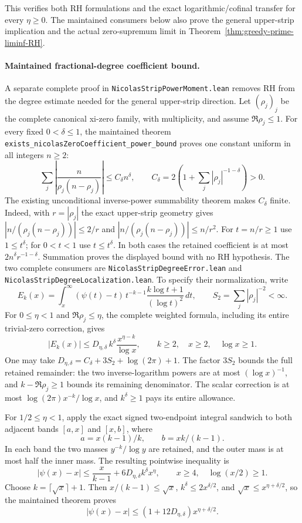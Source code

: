\documentclass[11pt]{article}
\theoremstyle{definition}
\begin{document}
This verifies both RH formulations and the exact logarithmic/cofinal
transfer for every $\eta\ge0$.
The maintained consumers below also prove the general upper-strip
implication and the actual zero-supremum limit in
Theorem~\ref{thm:greedy-prime-liminf-RH}.

\paragraph{Maintained fractional-degree coefficient bound.}
A separate complete proof in \texttt{NicolasStripPowerMoment.lean}
removes RH from the degree estimate needed for the general upper-strip
direction.  Let $(\rho_j)_j$ be the complete canonical xi-zero family,
with multiplicity, and assume $\Re\rho_j\le1$.
For every fixed $0<\delta\le1$, the maintained theorem
\texttt{exists\_\allowbreak nicolasZeroCoefficient\_\allowbreak power\_\allowbreak bound}
proves one constant uniform in all integers $n\ge2$:
\[
 \sum_j\left|\frac{n}{\rho_j(n-\rho_j)}\right|
       \le C_\delta n^\delta,\qquad
 C_\delta=2\left(1+\sum_j|\rho_j|^{-1-\delta}\right)>0 .
\]
The existing unconditional inverse-power summability theorem makes
$C_\delta$ finite.
Indeed, with $r=|\rho_j|$ the exact upper-strip geometry gives
$|n/(\rho_j(n-\rho_j))|\le2/r$ and
$|n/(\rho_j(n-\rho_j))|\le n/r^2$.
For $t=n/r\ge1$ use $1\le t^\delta$; for $0<t<1$ use
$t\le t^\delta$.
In both cases the retained coefficient is at most
$2n^\delta r^{-1-\delta}$.
Summation proves the displayed bound with no RH hypothesis.
The two complete consumers are
\texttt{NicolasStripDegreeError.lean} and
\texttt{NicolasStripDegreeLocalization.lean}.
To specify their normalization, write
\[
 E_k(x)=\int_x^\infty(\psi(t)-t)\,
       t^{-k-1}\frac{k\log t+1}{(\log t)^2}\,dt,
 \qquad S_2=\sum_j|\rho_j|^{-2}<\infty .
\]
For $0\le\eta<1$ and $\Re\rho_j\le\eta$, the complete weighted formula,
including its entire trivial-zero correction, gives
\[
 |E_k(x)|\le
 D_{\eta,\delta}\,k^\delta\frac{x^{\eta-k}}{\log x},
 \qquad k\ge2,\quad x\ge2,\quad\log x\ge1 .
\]
One may take
$D_{\eta,\delta}=C_\delta+3S_2+\log(2\pi)+1$.
The factor $3S_2$ bounds the full retained remainder:
the two inverse-logarithm powers are at most $(\log x)^{-1}$,
and $k-\Re\rho_j\ge1$ bounds its remaining denominator.
The scalar correction is at most
$\log(2\pi)x^{-k}/\log x$, and $k^\delta\ge1$ pays its
entire allowance.

For $1/2\le\eta<1$, apply the exact signed two-endpoint integral
sandwich to both adjacent bands $[a,x]$ and $[x,b]$, where
\[
 a=x(k-1)/k,\qquad b=xk/(k-1).
\]
In each band the two masses $y^{-k}/\log y$ are retained, and the
outer mass is at most half the inner mass.
The resulting pointwise inequality is
\[
 |\psi(x)-x|
 \le \frac{x}{k-1}+6D_{\eta,\delta}k^\delta x^\eta,
 \qquad x\ge4,\quad\log(x/2)\ge1 .
\]
Choose $k=\lceil\sqrt x\rceil+1$.
Then $x/(k-1)\le\sqrt x$,
$k^\delta\le2x^{\delta/2}$, and
$\sqrt x\le x^{\eta+\delta/2}$, so the maintained theorem proves
\[
 |\psi(x)-x|\le
 (1+12D_{\eta,\delta})x^{\eta+\delta/2}.
\]
\end{document}
